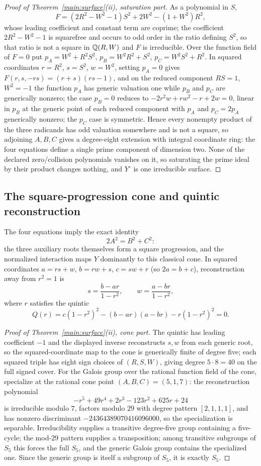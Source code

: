 \begin{proof}[Proof of Theorem~\ref{main:surface}(ii), saturation part]
As a polynomial in $S$,
\[
F=(2R^2-W^2-1)S^2+2W^2-(1+W^2)R^2,
\]
whose leading coefficient and constant term are coprime; the coefficient
$2R^2-W^2-1$ is squarefree and occurs to odd order in the ratio defining
$S^2$, so that ratio is not a square in $\mathbb{Q}(R,W)$ and $F$ is irreducible.
Over the function field of $F=0$ put $p_A=W^2+R^2S^2$, $p_B=W^2R^2+S^2$,
$p_C=W^2S^2+R^2$. In squared coordinates $r=R^2$, $s=S^2$, $w=W^2$, setting
$p_A=0$ gives $F(r,s,-rs)=(r+s)(rs-1)$, and on the reduced component
$RS=1$, $W^2=-1$ the function $p_A$ has generic valuation one while $p_B$
and $p_C$ are generically nonzero; the case $p_B=0$ reduces to
$-2r^2w+rw^2-r+2w=0$, linear in $p_B$ at the generic point of each reduced
component with $p_A$ and $p_C=2p_A$ generically nonzero; the $p_C$ case is
symmetric. Hence every nonempty product of the three radicands has odd
valuation somewhere and is not a square, so adjoining $A,B,C$ gives a
degree-eight extension with integral coordinate ring: the four equations
define a single prime component of dimension two. None of the declared
zero/collision polynomials vanishes on it, so saturating the prime ideal by
their product changes nothing, and $Y^{\circ}$ is one irreducible surface.
\end{proof}

\subsection{The square-progression cone and quintic reconstruction}

The four equations imply the exact identity
\[
2A^2=B^2+C^2 :
\]
the three auxiliary roots themselves form a square progression, and the
normalized interaction maps $Y$ dominantly to this classical cone. In squared
coordinates $a=rs+w$, $b=rw+s$, $c=sw+r$ (so $2a=b+c$), reconstruction away
from $r^2=1$ is
\[
s=\frac{b-ar}{1-r^2},\qquad w=\frac{a-br}{1-r^2},
\]
where $r$ satisfies the quintic
\[
Q(r)=c(1-r^2)^2-(b-ar)(a-br)-r(1-r^2)^2=0 .
\]

\begin{proof}[Proof of Theorem~\ref{main:surface}(ii), cone part]
The quintic has leading coefficient $-1$ and the displayed inverse
reconstructs $s,w$ from each generic root, so the squared-coordinate map to
the cone is generically finite of degree five; each squared triple has
eight sign choices of $(R,S,W)$, giving degree $5\cdot8=40$ on the full
signed cover. For the Galois group over the rational function field of the
cone, specialize at the rational cone point
$(A,B,C)=(5,1,7)$: the reconstruction polynomial
\[
-r^5+49r^4+2r^3-123r^2+625r+24
\]
is irreducible modulo $7$, factors modulo $29$ with degree pattern
$[2,1,1,1]$, and has nonzero discriminant $-24364389070416096000$, so the
specialization is separable. Irreducibility supplies a transitive
degree-five group containing a five-cycle; the mod-$29$ pattern supplies a
transposition; among transitive subgroups of $S_5$ this forces the full
$S_5$, and the generic Galois group contains the specialized one. Since
the generic group is itself a subgroup of $S_5$, it is exactly $S_5$.
\end{proof}

